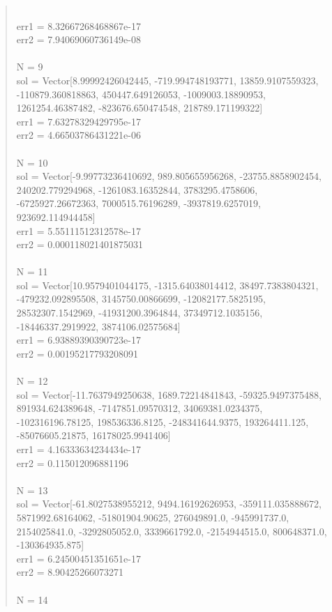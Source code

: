 \documentclass[letterpaper,12pt]{article}
\begin{document}
\begin{quote}
\\err1 = 8.32667268468867e-17
\\err2 = 7.94069060736149e-08
\\
\\N = 9
\\sol = Vector[8.99992426042445, -719.994748193771, 13859.9107559323, -110879.360818863, 450447.649126053, -1009003.18890953, 1261254.46387482, -823676.650474548, 218789.171199322]
\\err1 = 7.63278329429795e-17
\\err2 = 4.66503786431221e-06
\\
\\N = 10
\\sol = Vector[-9.99773236410692, 989.805655956268, -23755.8858902454, 240202.779294968, -1261083.16352844, 3783295.4758606, -6725927.26672363, 7000515.76196289, -3937819.6257019, 923692.114944458]
\\err1 = 5.55111512312578e-17
\\err2 = 0.000118021401875031
\\
\\N = 11
\\sol = Vector[10.9579401044175, -1315.64038014412, 38497.7383804321, -479232.092895508, 3145750.00866699, -12082177.5825195, 28532307.1542969, -41931200.3964844, 37349712.1035156, -18446337.2919922, 3874106.02575684]
\\err1 = 6.93889390390723e-17
\\err2 = 0.00195217793208091
\\
\\N = 12
\\sol = Vector[-11.7637949250638, 1689.72214841843, -59325.9497375488, 891934.624389648, -7147851.09570312, 34069381.0234375, -102316196.78125, 198536336.8125, -248341644.9375, 193264411.125, -85076605.21875, 16178025.9941406]
\\err1 = 4.16333634234434e-17
\\err2 = 0.115012096881196
\\
\\N = 13
\\sol = Vector[-61.8027538955212, 9494.16192626953, -359111.035888672, 5871992.68164062, -51801904.90625, 276049891.0, -945991737.0, 2154025841.0, -3292805052.0, 3339661792.0, -2154944515.0, 800648371.0, -130364935.875]
\\err1 = 6.24500451351651e-17
\\err2 = 8.90425266073271
\\
\\N = 14

\end{quote}
\end{document}
